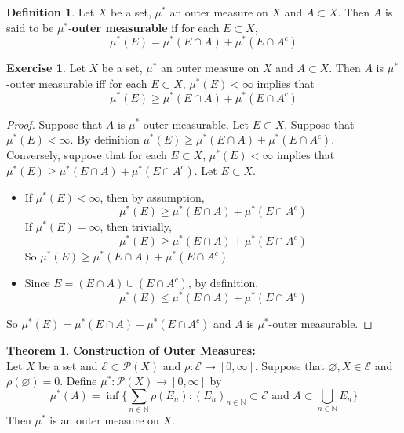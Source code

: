 \documentclass[12pt]{amsart}
\theoremstyle{definition}
\newtheorem{defn}[definition]{Definition}
\newtheorem{thm}[definition]{Theorem}
\newtheorem{ex}[definition]{Exercise}
\newcommand{\N}{\mathbb{N}}
\newcommand{\MP}{\mathcal{P}}
\newcommand{\ME}{\mathcal{E}}
\newcommand{\ld}[1]{\label{defn:#1}}
\begin{document}
		\begin{defn} \ld{00000} 
		Let $X$ be a set, $\mu^*$ an outer measure on $X$ and $A \subset X$. Then $A$ is said to be $\mu^*$-\textbf{outer measurable} if for each $E \subset X$, 
	\begin{equation*}
	\mu^*(E) = \mu^*(E \cap A) + \mu^*(E \cap A^c)
	\end{equation*}
	\end{defn}
	
	\begin{ex}
	Let $X$ be a set, $\mu^*$ an outer measure on $X$ and $A \subset X$. Then $A$ is $\mu^*$-outer measurable iff for each $E \subset X$, $\mu^*(E) < \infty$ implies that 
	\begin{equation*}
	\mu^*(E) \geq \mu^*(E \cap A) + \mu^*(E \cap A^c)
	\end{equation*}
	\end{ex}	
	
	\begin{proof}
	Suppose that $A$ is $\mu^*$-outer measurable. Let $E \subset X$, Suppose that $\mu^*(E) < \infty$. By definition $\mu^*(E) \geq \mu^*(E \cap A) + \mu^*(E \cap A^c)$. \\
	Conversely, suppose that for each $E \subset X$, $\mu^*(E) < \infty$ implies that $\mu^*(E) \geq \mu^*(E \cap A) + \mu^*(E \cap A^c)$. Let $E \subset X$. 
	\begin{itemize}
	\item If $\mu^*(E) < \infty$, then by assumption, 
	\begin{equation*}
	\mu^*(E) \geq \mu^*(E \cap A) + \mu^*(E \cap A^c)
	\end{equation*}		
	If $\mu^*(E) = \infty$, then trivially, 
	\begin{equation*}
	\mu^*(E) \geq \mu^*(E \cap A) + \mu^*(E \cap A^c)
	\end{equation*}	 
	So $\mu^*(E) \geq \mu^*(E \cap A) + \mu^*(E \cap A^c)$
	\item Since $E = (E \cap A) \cup (E \cap A^c)$, by definition, 
	\begin{equation*}
	\mu^*(E) \leq \mu^*(E \cap A) + \mu^*(E \cap A^c)
	\end{equation*}	
	\end{itemize}
	So $\mu^*(E) = \mu^*(E \cap A) + \mu^*(E \cap A^c)$ and $A$ is $\mu^*$-outer measurable.
	\end{proof}
	
	\begin{thm}\textbf{Construction of Outer Measures:} \\
		Let $X$ be a set and $\ME \subset \MP(X)$ and $\rho: \ME \rightarrow [0, \infty]$. Suppose that $\varnothing, X \in \ME$ and $\rho(\varnothing) = 0$. Define $\mu^*:\MP(X) \rightarrow [0, \infty]$ by $$\mu^*(A) = \inf \bigg \{\sum_{n \in \N}\rho(E_n): (E_n)_{n \in \N} \subset \ME \text{ and }A \subset \bigcup_{n \in \N}E_n \bigg \}$$ Then $\mu^*$ is an outer measure on $X$.
	\end{thm}
	
\end{document}
